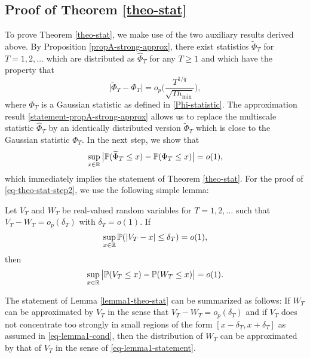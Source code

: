 \newpage
\subsection*{Proof of Theorem \ref{theo-stat}}


To prove Theorem \ref{theo-stat}, we make use of the two auxiliary results derived above. By Proposition \ref{propA-strong-approx}, there exist statistics $\widetilde{\Phi}_T$ for $T = 1,2,\ldots$ which are distributed as $\widehat{\Phi}_T$ for any $T \ge 1$ and which have the property that 
\begin{equation}\label{statement-propA-strong-approx}
\big| \widetilde{\Phi}_T - \Phi_T \big| = o_p \Big( \frac{T^{1/q}}{\sqrt{T h_{\min}}} \Big), 
\end{equation}
where $\Phi_T$ is a Gaussian statistic as defined in \eqref{Phi-statistic}. The approximation result \eqref{statement-propA-strong-approx} allows us to replace the multiscale statistic $\widehat{\Phi}_T$ by an identically distributed version $\widetilde{\Phi}_T$ which is close to the Gaussian statistic $\Phi_T$. In the next step, we show that  
\begin{equation}\label{eq-theo-stat-step2}
\sup_{x \in \mathbb{R}} \big| \mathbb{P}(\widetilde{\Phi}_T \le x) - \mathbb{P}(\Phi_T \le x) \big| = o(1), 
\end{equation}
which immediately implies the statement of Theorem \ref{theo-stat}. For the proof of \eqref{eq-theo-stat-step2}, we use the following simple lemma: 
\begin{lemmaA}\label{lemma1-theo-stat}
Let $V_T$ and $W_T$ be real-valued random variables for $T = 1,2,\ldots$ such that $V_T - W_T = o_p(\delta_T)$ with $\delta_T = o(1)$. If 
\begin{equation}\label{eq-lemma1-cond}
\sup_{x \in \mathbb{R}} \mathbb{P}(|V_T - x| \le \delta_T) = o(1), 
\end{equation}
then 
\begin{equation}\label{eq-lemma1-statement}
\sup_{x \in \mathbb{R}} \big| \mathbb{P}(V_T \le x) - \mathbb{P}(W_T \le x) \big| = o(1). 
\end{equation}
\end{lemmaA}
The statement of Lemma \ref{lemma1-theo-stat} can be summarized as follows: If $W_T$ can be approximated by $V_T$ in the sense that $V_T - W_T = o_p(\delta_T)$ and if $V_T$ does not concentrate too strongly in small regions of the form $[x - \delta_T,x+\delta_T]$ as assumed in \eqref{eq-lemma1-cond}, then the distribution of $W_T$ can be approximated by that of $V_T$ in the sense of \eqref{eq-lemma1-statement}.
